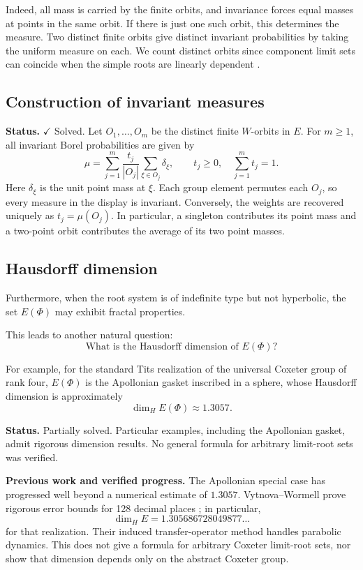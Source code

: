 \documentclass[11pt,reqno]{amsart}
\theoremstyle{plain}
\theoremstyle{definition}
\theoremstyle{remark}
\numberwithin{equation}{section}
\begin{document}
Indeed, all mass is carried by the finite orbits, and invariance
forces equal masses at points in the same orbit. If there is just one
such orbit, this determines the measure. Two distinct finite orbits
give distinct invariant probabilities by taking the uniform measure
on each. We count distinct orbits since component limit sets can
coincide when the simple roots are linearly dependent
\cite[Remark~3.3]{DHR}.

\subsection{Construction of invariant measures}
\noindent\textbf{Status.} $\checkmark$ Solved. Let $O_1,\dots,O_m$
be the distinct finite $W$-orbits in $E$. For $m\ge1$, all invariant
Borel probabilities are given by
\[
\boxed{\displaystyle
\mu=\sum_{j=1}^{m}\frac{t_j}{|O_j|}
                 \sum_{\xi\in O_j}\delta_\xi,\qquad
t_j\ge0,\quad \sum_{j=1}^{m}t_j=1.}
\]
Here $\delta_\xi$ is the unit point mass at $\xi$. Each group element
permutes each $O_j$, so every measure in the display is invariant.
Conversely, the weights are recovered uniquely as $t_j=\mu(O_j)$.
In particular, a singleton contributes its point mass and a two-point
orbit contributes the average of its two point masses.

\subsection{Hausdorff dimension}
Furthermore, when the root system is of indefinite
type but not hyperbolic, the set $E(\Phi)$ may exhibit
fractal properties.

This leads to another natural question:
\[
\boxed{
\text{What is the Hausdorff dimension of }E(\Phi)?
}
\]

For example, for the standard Tits realization of
the universal Coxeter group of rank four,
$E(\Phi)$ is the Apollonian gasket inscribed in a sphere,
whose Hausdorff dimension is approximately
\[
\dim_H E(\Phi)\approx 1.3057.
\]


\par\medskip
\noindent\textbf{Status.} Partially solved. Particular examples, including the Apollonian gasket, admit rigorous dimension results. No general formula for arbitrary limit-root sets was verified.

\par\medskip
\noindent\textbf{Previous work and verified progress.}
The Apollonian special case has progressed well beyond a numerical
estimate of $1.3057$. Vytnova--Wormell prove rigorous error bounds for
128 decimal places \cite[Theorem~1.1]{VW2025}; in particular,
\[
\dim_H E=1.305686728049877\ldots
\]
for that realization. Their induced transfer-operator method handles
parabolic dynamics. This does not give a formula for arbitrary Coxeter
limit-root sets, nor show that dimension depends only on the abstract
Coxeter group.
\end{document}

